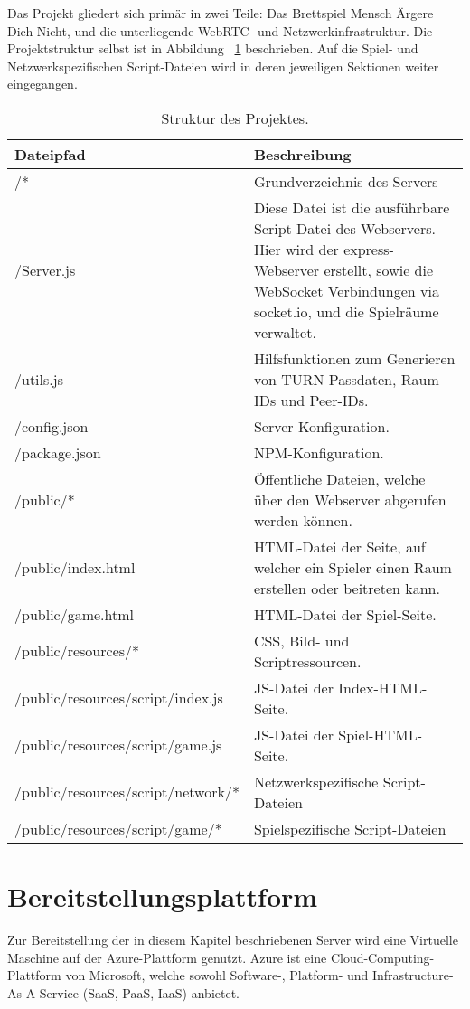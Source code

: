 Das Projekt gliedert sich primär in zwei Teile: Das Brettspiel \glqq{}Mensch Ärgere Dich Nicht\grqq{}, und die unterliegende \acs{WebRTC}- und Netzwerkinfrastruktur. Die Projektstruktur selbst ist in Abbildung~ \ref{table:projectfiles} beschrieben. Auf die Spiel- und Netzwerkspezifischen Script-Dateien wird in deren jeweiligen Sektionen weiter eingegangen.

\begin{table}[ht]
\centering
\begin{tabularx}{\textwidth}{lX}
\toprule
Dateipfad&Beschreibung\\
\midrule
/*&Grundverzeichnis des Servers\\
/Server.js&Diese Datei ist die ausführbare Script-Datei des Webservers. Hier wird der express-Webserver erstellt, sowie die WebSocket Verbindungen via socket.io, und die Spielräume verwaltet.\\
/utils.js&Hilfsfunktionen zum Generieren von TURN-Passdaten, Raum-IDs und Peer-IDs.\\
/config.json&Server-Konfiguration.\\
/package.json&NPM-Konfiguration.\\
\midrule
/public/*&Öffentliche Dateien, welche über den Webserver abgerufen werden können.\\
/public/index.html&HTML-Datei der Seite, auf welcher ein Spieler einen Raum erstellen oder beitreten kann.\\
/public/game.html&HTML-Datei der Spiel-Seite.\\
\midrule
/public/resources/*&CSS, Bild- und Scriptressourcen.\\
/public/resources/script/index.js&JS-Datei der Index-HTML-Seite.\\
/public/resources/script/game.js&JS-Datei der Spiel-HTML-Seite.\\
\midrule
/public/resources/script/network/*&Netzwerkspezifische Script-Dateien\\
/public/resources/script/game/*&Spielspezifische Script-Dateien\\
\bottomrule
\end{tabularx}
\caption{Struktur des Projektes.}
\label{table:projectfiles}
\end{table}

\section{Bereitstellungsplattform}
Zur Bereitstellung der in diesem Kapitel beschriebenen Server wird eine Virtuelle Maschine auf der Azure-Plattform genutzt. Azure ist eine Cloud-Computing-Plattform von Microsoft, welche sowohl Software-, Platform- und Infrastructure-As-A-Service (SaaS, PaaS, IaaS) anbietet.\par

